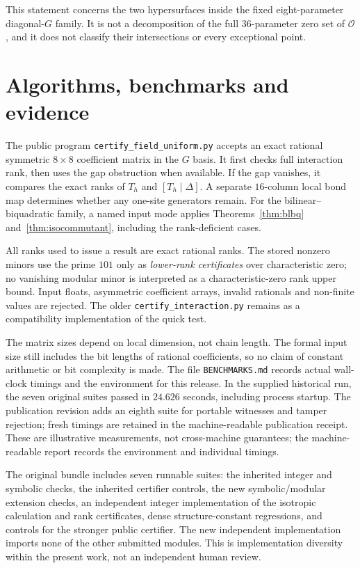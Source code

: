 \documentclass[11pt,a4paper]{article}
\numberwithin{equation}{section}
\theoremstyle{definition}\newtheorem{definition}[theorem]{Definition}
\theoremstyle{remark}\newtheorem{remark}[theorem]{Remark}
\newcommand{\Ob}{\mathcal O}\newcommand{\tens}{\otimes}
\begin{document}
This statement concerns the two hypersurfaces inside the fixed eight-parameter diagonal-$G$ family. It is not a decomposition of the full 36-parameter zero set of $\Ob$, and it does not classify their intersections or every exceptional point.

\section{Algorithms, benchmarks and evidence}\label{sec:evidence}

The public program \texttt{certify\_field\_uniform.py} accepts an exact rational symmetric $8\times8$ coefficient matrix in the $G$ basis. It first checks full interaction rank, then uses the gap obstruction when available. If the gap vanishes, it compares the exact ranks of $T_h$ and $[T_h\mid\Delta]$. A separate $16$-column local bond map determines whether any one-site generators remain. For the bilinear--biquadratic family, a named input mode applies Theorems~\ref{thm:blbq} and~\ref{thm:isocommutant}, including the rank-deficient cases.

All ranks used to issue a result are exact rational ranks. The stored nonzero minors use the prime $101$ only as \emph{lower-rank certificates} over characteristic zero; no vanishing modular minor is interpreted as a characteristic-zero rank upper bound. Input floats, asymmetric coefficient arrays, invalid rationals and non-finite values are rejected. The older \texttt{certify\_interaction.py} remains as a compatibility implementation of the quick test.

The matrix sizes depend on local dimension, not chain length. The formal input size still includes the bit lengths of rational coefficients, so no claim of constant arithmetic or bit complexity is made. The file \texttt{BENCHMARKS.md} records actual wall-clock timings and the environment for this release. In the supplied historical run, the seven original suites passed in $24.626$ seconds, including process startup. The publication revision adds an eighth suite for portable witnesses and tamper rejection; fresh timings are retained in the machine-readable publication receipt. These are illustrative measurements, not cross-machine guarantees; the machine-readable report records the environment and individual timings.

The original bundle includes seven runnable suites: the inherited integer and symbolic checks, the inherited certifier controls, the new symbolic/modular extension checks, an independent integer implementation of the isotropic calculation and rank certificates, dense structure-constant regressions, and controls for the stronger public certifier. The new independent implementation imports none of the other submitted modules. This is implementation diversity within the present work, not an independent human review.
\end{document}
